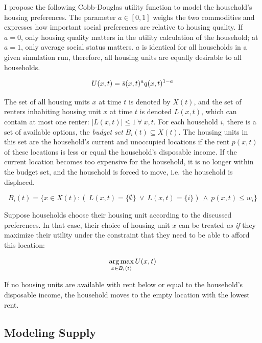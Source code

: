 \documentclass[a4paper,12pt]{article}
\begin{document}
I propose the following Cobb-Douglas utility function to model the household's housing preferences. The parameter $a \in [0, 1]$ weighs the two commodities and expresses how important social preferences are relative to housing quality. If $a = 0$, only housing quality matters in the utility calculation of the household; at $a = 1$, only average social status matters. $a$ is identical for all households in a given simulation run, therefore, all housing units are equally desirable to all households.

\begin{equation}
 U(x, t) = \\ \bar{s}(x, t)^a \\ q(x, t)^{1-a}
\end{equation}
\label{eq:util}

The set of all housing units $x$ at time $t$ is denoted by $X(t)$, and the set of renters inhabiting housing unit $x$ at time $t$ is denoted $L(x, t)$, which can contain at most one renter: $|L(x, t)| \leq 1 \ \forall \ x, t$. For each household $i$, there is a set of available options, the \textit{budget set} $B_i(t) \subseteq X(t)$. The housing units in this set are the household's current and unoccupied locations if the rent $p(x, t)$ of these locations is less or equal the household's disposable income. If the current location becomes too expensive for the household, it is no longer within the budget set, and the household is forced to move, i.e. the household is displaced. 

\begin{equation}
B_i(t) = \{x \in X(t): (\ L(x, t) = \{\emptyset\} \ \lor \ L(x, t) = \{i\}) \ \land \ p(x, t) \leq w_i \}
\end{equation}

Suppose households choose their housing unit according to the discussed preferences. In that case, their choice of housing unit $x$ can be treated \textit{as if} they maximize their utility under the constraint that they need to be able to afford this location:

\begin{equation}
\operatorname*{arg\,max}_{x \in B_i(t)} U(x, t) \\*
\end{equation}

If no housing units are available with rent below or equal to the household's disposable income, the household moves to the empty location with the lowest rent. 


\subsection*{Modeling Supply}
\end{document}
